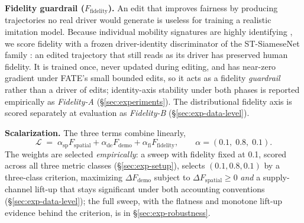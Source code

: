 \textbf{Fidelity guardrail ($F_{\mathrm{fidelity}}$).} An edit that improves
fairness by producing trajectories no real driver would generate is useless
for training a realistic imitation model. Because individual mobility signatures
are highly identifying \cite{gao2017tuler,zhou2018tulvae,miao2020deeptul}, we score
fidelity with a frozen driver-identity discriminator of the ST-SiameseNet
family \cite{ren2020stsiamese}: an edited trajectory that still reads as its
driver has preserved human fidelity. It is trained once, never updated during
editing, and has near-zero gradient under FATE's small bounded edits, so it
acts as a fidelity \emph{guardrail} rather than a driver of edits;
identity-axis stability under both phases is reported empirically as
\emph{Fidelity-A} (\S\ref{sec:experiments}). The
distributional fidelity axis is scored separately at evaluation as
\emph{Fidelity-B} (\S\ref{sec:exp-data-level}).

\textbf{Scalarization.} The three terms combine linearly,
\begin{equation}\label{eq:objective}
\mathcal{L} \;=\; \alpha_{\mathrm{sp}} F_{\mathrm{spatial}}
+ \alpha_{\mathrm{de}} F_{\mathrm{demo}}
+ \alpha_{\mathrm{fi}} F_{\mathrm{fidelity}},
\qquad \alpha = (0.1,\; 0.8,\; 0.1).
\end{equation}
The weights are selected \emph{empirically}: a sweep with fidelity fixed at
0.1, scored across all three metric classes (\S\ref{sec:exp-setup}), selects
$(0.1, 0.8, 0.1)$ by a three-class criterion, maximizing
$\Delta F_{\mathrm{demo}}$ subject to $\Delta F_{\mathrm{spatial}} \ge 0$
\emph{and} a supply-channel lift-up that stays significant under both
accounting conventions (\S\ref{sec:exp-data-level}); the full sweep, with the
flatness and monotone
lift-up evidence behind the criterion, is in \S\ref{sec:exp-robustness}.

